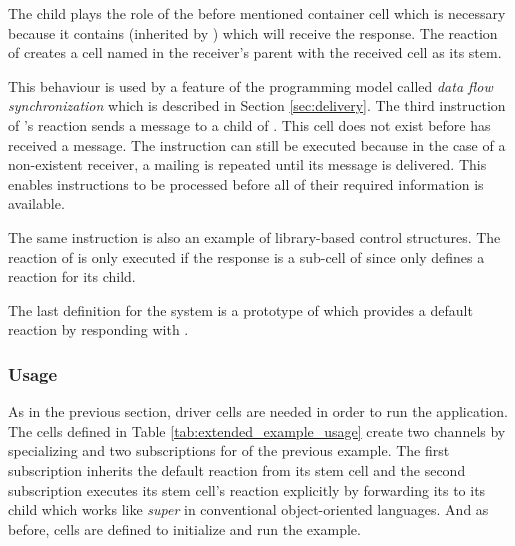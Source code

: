 The child  plays the role of the before mentioned container cell which is necessary because it contains  (inherited by ) which will receive the response. The reaction of  creates a cell named  in the receiver's parent with the received cell as its stem.

This behaviour is used by a feature of the programming model called \textit{data flow synchronization} which is described in Section \ref{sec:delivery}. The third instruction of 's reaction sends a message to a child of . This cell does not exist before  has received a message. The instruction can still be executed because in the case of a non-existent receiver, a mailing is repeated until its message is delivered. This enables instructions to be processed before all of their required information is available.

The same instruction is also an example of library-based control structures. The reaction of  is only executed if the response is a sub-cell of  since only  defines a reaction for its  child.

The last definition for the system is a prototype of  which provides a default reaction by responding with .

\subsubsection{Usage}

As in the previous section, driver cells are needed in order to run the application. The cells defined in Table \ref{tab:extended_example_usage} create two channels by specializing  and two subscriptions for  of the previous example. The first subscription inherits the default reaction from its stem cell  and the second subscription executes its stem cell's reaction explicitly by forwarding its  to its child  which works like \textit{super} in conventional object-oriented languages. And as before, cells are defined to initialize and run the example.

